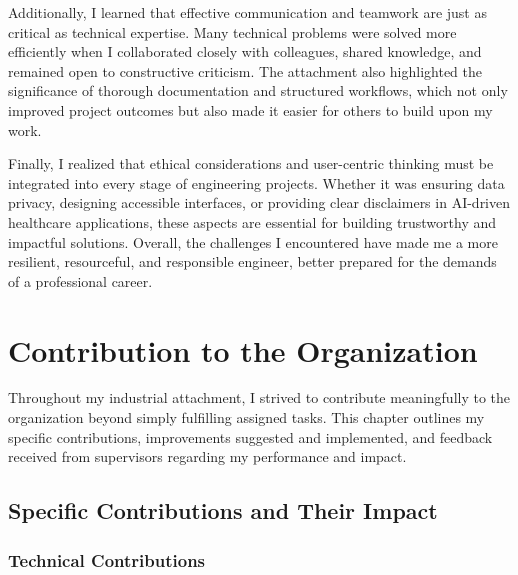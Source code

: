 \documentclass[12pt,a4paper]{article}
\begin{document}
Additionally, I learned that effective communication and teamwork are just as critical as technical expertise. Many technical problems were solved more efficiently when I collaborated closely with colleagues, shared knowledge, and remained open to constructive criticism. The attachment also highlighted the significance of thorough documentation and structured workflows, which not only improved project outcomes but also made it easier for others to build upon my work.

Finally, I realized that ethical considerations and user-centric thinking must be integrated into every stage of engineering projects. Whether it was ensuring data privacy, designing accessible interfaces, or providing clear disclaimers in AI-driven healthcare applications, these aspects are essential for building trustworthy and impactful solutions. Overall, the challenges I encountered have made me a more resilient, resourceful, and responsible engineer, better prepared for the demands of a professional career.

\newpage
\section{Contribution to the Organization}

Throughout my industrial attachment, I strived to contribute meaningfully to the organization beyond simply fulfilling assigned tasks. This chapter outlines my specific contributions, improvements suggested and implemented, and feedback received from supervisors regarding my performance and impact.

\subsection{Specific Contributions and Their Impact}

\subsubsection{Technical Contributions}
\end{document}
